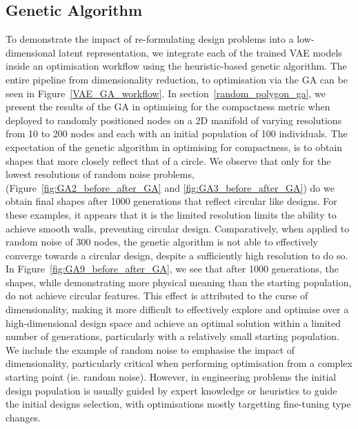 \documentclass{article}
\begin{document}
\subsection{Genetic Algorithm}
To demonstrate the impact of re-formulating design problems into a low-dimensional latent representation, we integrate each of the trained VAE models inside an optimisation workflow using the heuristic-based genetic algorithm. The entire pipeline from dimensionality reduction, to optimisation via the GA can be seen in Figure~\ref{VAE_GA_workflow}. In section~\ref{random_polygon_ga}, we present the results of the GA in optimising for the compactness metric when deployed to randomly positioned nodes on a 2D manifold of varying resolutions from 10 to 200 nodes and each with an initial population of 100 individuals. The expectation of the genetic algorithm in optimising for compactness, is to obtain shapes that more closely reflect that of a circle. We observe that only for the lowest resolutions of random noise problems, (Figure~\ref{fig:GA2_before_after_GA} and \ref{fig:GA3_before_after_GA}) do we obtain final shapes after 1000 generations that reflect circular like designs. For these examples, it appears that it is the limited resolution limits the ability to achieve smooth walls, preventing circular design. Comparatively, when applied to random noise of 300 nodes, the genetic algorithm is not able to effectively converge towards a circular design, despite a sufficiently high resolution to do so. In Figure~\ref{fig:GA9_before_after_GA}, we see that after 1000 generations, the shapes, while demonstrating more physical meaning than the starting population, do not achieve circular features. This effect is attributed to the curse of dimensionality, making it more difficult to effectively explore and optimise over a high-dimensional design space and achieve an optimal solution within a limited number of generations, particularly with a relatively small starting population. We include the example of random noise to emphasise the impact of dimensionality, particularly critical when performing optimisation from a complex starting point (ie. random noise). However, in engineering problems the initial design population is usually guided by expert knowledge or heuristics to guide the initial designs selection, with optimisations mostly targetting fine-tuning type changes.
\end{document}
